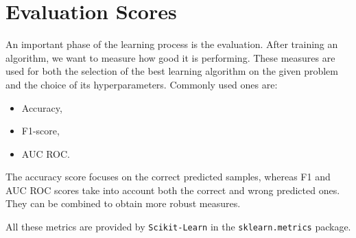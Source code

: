 \section{Evaluation Scores}
\label{sec:scores}

An important phase of the learning process is the evaluation.
After training an algorithm, we want to measure how good it is performing.
These measures are used for both the selection of the best learning algorithm on the given problem and the choice of its hyperparameters. Commonly used ones are:
\begin{itemize}
    \item Accuracy,
    \item F1-score,
    \item AUC ROC.
\end{itemize}

The accuracy score focuses on the correct predicted samples, whereas F1 and AUC ROC scores take into account both the correct and wrong predicted ones.
They can be combined to obtain more robust measures.

All these metrics are provided by \texttt{Scikit-Learn} in the \texttt{sklearn.metrics} package.
